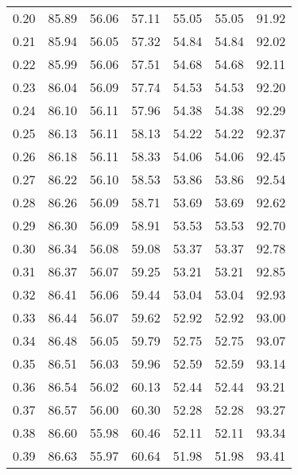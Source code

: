 \begin{tabular}{|c|c|c|c|c|c|c|}
      0.20 &     85.89 &     56.06 &      57.11 &   55.05 &      55.05 &         91.92 \\
      0.21 &     85.94 &     56.05 &      57.32 &   54.84 &      54.84 &         92.02 \\
      0.22 &     85.99 &     56.06 &      57.51 &   54.68 &      54.68 &         92.11 \\
      0.23 &     86.04 &     56.09 &      57.74 &   54.53 &      54.53 &         92.20 \\
      0.24 &     86.10 &     56.11 &      57.96 &   54.38 &      54.38 &         92.29 \\
      0.25 &     86.13 &     56.11 &      58.13 &   54.22 &      54.22 &         92.37 \\
      0.26 &     86.18 &     56.11 &      58.33 &   54.06 &      54.06 &         92.45 \\
      0.27 &     86.22 &     56.10 &      58.53 &   53.86 &      53.86 &         92.54 \\
      0.28 &     86.26 &     56.09 &      58.71 &   53.69 &      53.69 &         92.62 \\
      0.29 &     86.30 &     56.09 &      58.91 &   53.53 &      53.53 &         92.70 \\
      0.30 &     86.34 &     56.08 &      59.08 &   53.37 &      53.37 &         92.78 \\
      0.31 &     86.37 &     56.07 &      59.25 &   53.21 &      53.21 &         92.85 \\
      0.32 &     86.41 &     56.06 &      59.44 &   53.04 &      53.04 &         92.93 \\
      0.33 &     86.44 &     56.07 &      59.62 &   52.92 &      52.92 &         93.00 \\
      0.34 &     86.48 &     56.05 &      59.79 &   52.75 &      52.75 &         93.07 \\
      0.35 &     86.51 &     56.03 &      59.96 &   52.59 &      52.59 &         93.14 \\
      0.36 &     86.54 &     56.02 &      60.13 &   52.44 &      52.44 &         93.21 \\
      0.37 &     86.57 &     56.00 &      60.30 &   52.28 &      52.28 &         93.27 \\
      0.38 &     86.60 &     55.98 &      60.46 &   52.11 &      52.11 &         93.34 \\
      0.39 &     86.63 &     55.97 &      60.64 &   51.98 &      51.98 &         93.41 \\

\end{tabular}
